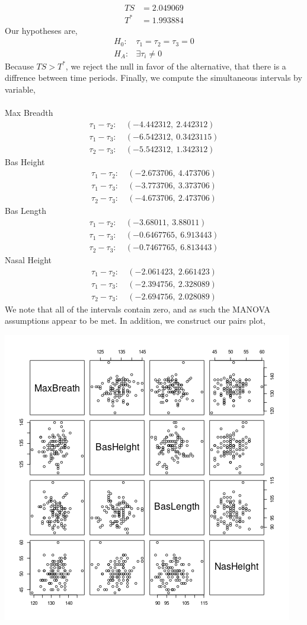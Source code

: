 \documentclass[letterpaper,10pt]{article}
\begin{document}
\begin{description}
\begin{align*}
TS &= 2.049069\\
T^* &= 1.993884
\end{align*}
Our hypotheses are,
\begin{align*}
H_0: & \tau_1=\tau_2=\tau_3=0\\
H_A: & \exists \tau_i\neq 0
\end{align*}
Because $TS>T^*$, we reject the null in favor of the alternative, that there is a diffrence between time periods.
Finally, we compute the simultaneous intervals by variable,\\\\
Max Breadth
\begin{align*}
\tau_1-\tau_2: &\ (-4.442312,\ 2.442312)\\
\tau_1-\tau_3: &\ (-6.542312,\ 0.3423115)\\
\tau_2-\tau_3: &\ (-5.542312,\ 1.342312)
\end{align*}
Bas Height
\begin{align*}
\tau_1-\tau_2: &\ (-2.673706,\ 4.473706)\\
\tau_1-\tau_3: &\ (-3.773706,\ 3.373706)\\
\tau_2-\tau_3: &\ (-4.673706,\ 2.473706)
\end{align*}
Bas Length
\begin{align*}
\tau_1-\tau_2: &\ (-3.68011,\ 3.88011)\\
\tau_1-\tau_3: &\ (-0.6467765,\ 6.913443)\\
\tau_2-\tau_3: &\ (-0.7467765,\ 6.813443)
\end{align*}
Nasal Height
\begin{align*}
\tau_1-\tau_2: &\ (-2.061423,\ 2.661423)\\
\tau_1-\tau_3: &\ (-2.394756,\ 2.328089)\\
\tau_2-\tau_3: &\ (-2.694756,\ 2.028089)
\end{align*}
We note that all of the intervals contain zero, and as such the MANOVA assumptions appear to be met. In addition, we construct our pairs plot,
\begin{center}
\includegraphics[scale=1]{624pair.png}

\end{center}
\end{description}
\end{document}

